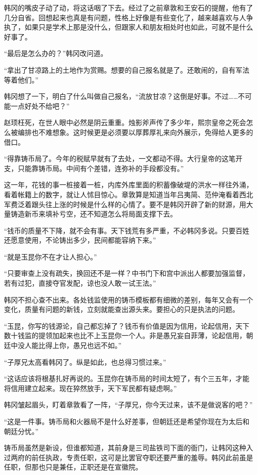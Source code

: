 韩冈的嘴皮子动了动，将这话咽了下去。经过了之前章敦和王安石的提醒，他有了几分自省。回想起来也真是有问题，性格上好像是有些变化了，越来越喜欢与人争执了，如果只是学术上那是没什么，但跟家人和朋友相处时也如此，可就不是什么好事了。

“最后是怎么办的？”韩冈改问道。

“拿出了甘凉路上的土地作为赏赐。想要的自己报名就是了。还敢闹的，自有军法等着他们。”

韩冈想了一下，明白了什么叫做自己报名，“流放甘凉？这倒是好事。不过……不可能一点好处不给吧？”

赵顼枉死，在世人眼中必然是阴云重重。烛影斧声传了多少年，熙宗皇帝之死会怎么被编排也不难想象。这时候更是必须要以厚葬厚礼来向外展示，免得给人更多的借口。

“得靠铸币局了。今年的税赋早就有了去处，一文都动不得。大行皇帝的这笔开支，只能靠铸币局。中间有个差错，连弥补的手段都没有。”

这一年，花钱的事一桩接着一桩，内库外库里面的积蓄像破堤的洪水一样往外涌，看着帐籍上的数字，就让人怵目惊心。章敦算是知道当年吕夷简、范仲淹看着西北军费泛着跟头往上涨的时候是什么样的心情了。要不是韩冈开辟了新的财源，用大量铸造新币来填补亏空，还不知道怎么将局面支撑下去。

“钱币的质量不下降，就不会有事。天下钱荒有多严重，不必韩冈多说。只要百姓还愿意使用，不论铸出多少，民间都能容纳下来。”

“就是玉昆你不在才让人担心。”

“只要审查上没有疏失，换回还不是一样？中书门下和宫中派出人都要加强监督，若有过犯，直接夺官发配，谅也没人敢一试王法。”

韩冈不担心查不出来。各处钱监使用的铸币模板都有细微的差别，每年又会有一个变化，质量有问题的新钱，立刻就能查出源头来。要担心的只是执法的问题。

“玉昆，你写的钱源论，自己都忘掉了？钱币有价值是因为信用，论起信用，天下数十钱监的提领加起来也比不上玉昆你一个人。非是愚兄妄自菲薄，论起信用，朝廷中没人能比得上你，愚兄也远不如。”

“子厚兄太高看韩冈了。纵是如此，也总得习惯过来。”

“这话应该将根基扎好再说的。玉昆你在铸币局的时间太短了，有个三五年，才能将信用建立起来。现在猝然放手，天下军民都有疑虑啊。”

韩冈皱起眉头，盯着章敦看了一阵，“子厚兄，你今天过来，该不是做说客的吧？”

“这是一件事。铸币局和火器局不是什么好差事，但朝廷还是希望你现在为太后和朝廷分忧。”

铸币局虽然是新设，但谁都知道，其前身是三司盐铁司下面的衙门，让韩冈这种入过两府的前任执政，专责任职，这可是比罢官夺职还要严重的羞辱。韩冈此前虽是任职，但那也只是兼任，正职还是在宣徽院。

